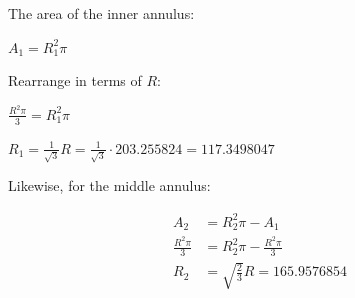\documentclass[a4paper,12pt]{article}
\begin{document}
    The area of the inner annulus:

    \begin{center}
        $A_1=R_1^2\pi$
    \end{center}

    Rearrange in terms of $R$:

    \begin{center}
        $\frac{R^2\pi}{3}=R_1^2\pi$

        $R_1=\frac{1}{\sqrt{3}}R=\frac{1}{\sqrt{3}}\cdot203.255824=117.3498047$
    \end{center}

    Likewise, for the middle annulus:
    \begin{center}
        \begin{equation}
            \begin{split}
                A_2&=R_2^2\pi-A_1
                \\
                \frac{R^2\pi}{3}&=R_2^2\pi-\frac{R^2\pi}{3}
                \\
                R_2&=\sqrt{\frac{2}{3}}R=165.9576854
            \end{split}
        \end{equation}
    \end{center}
\end{document}
